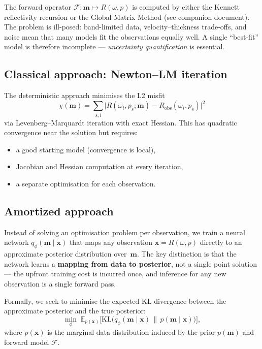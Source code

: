 \documentclass[11pt,a4paper]{article}
\newcommand{\KL}{\mathrm{KL}}
\newcommand{\Robs}{R_{\mathrm{obs}}}
\theoremstyle{plain}
\theoremstyle{remark}
\begin{document}
The forward operator $\mathcal{F}: \mathbf{m} \mapsto R(\omega, p)$
is computed by either the Kennett reflectivity recursion or the
Global Matrix Method (see companion document).  The problem is
ill-posed: band-limited data, velocity--thickness trade-offs, and
noise mean that many models fit the observations equally well.
A single ``best-fit'' model is therefore incomplete ---
\emph{uncertainty quantification} is essential.

\subsection{Classical approach: Newton--LM iteration}

The deterministic approach minimises the L2 misfit
\begin{equation}\label{eq:misfit}
  \chi(\mathbf{m})
  = \sum_{s,i}
    \bigl|R(\omega_i, p_s; \mathbf{m})
          - \Robs(\omega_i, p_s)\bigr|^2
\end{equation}
via Levenberg--Marquardt iteration with exact Hessian.  This has
quadratic convergence near the solution but requires:
\begin{itemize}[nosep]
  \item a good starting model (convergence is local),
  \item Jacobian and Hessian computation at every iteration,
  \item a separate optimisation for each observation.
\end{itemize}

\subsection{Amortized approach}

Instead of solving an optimisation problem per observation, we train a
neural network $q_\phi(\mathbf{m} \mid \mathbf{x})$ that maps any
observation $\mathbf{x} = R(\omega, p)$ directly to an approximate
posterior distribution over~$\mathbf{m}$.  The key distinction is that
the network learns a \textbf{mapping from data to posterior}, not a
single point solution --- the upfront training cost is incurred once,
and inference for any new observation is a single forward pass.

Formally, we seek to minimise the expected KL divergence between the
approximate posterior and the true posterior:
\begin{equation}\label{eq:amortized-kl}
  \min_\phi\;
  \mathbb{E}_{p(\mathbf{x})}
  \bigl[\KL\!\bigl(q_\phi(\mathbf{m}\mid\mathbf{x})
    \,\|\, p(\mathbf{m}\mid\mathbf{x})\bigr)\bigr],
\end{equation}
where $p(\mathbf{x})$ is the marginal data distribution induced by the
prior $p(\mathbf{m})$ and forward model $\mathcal{F}$.
\end{document}
